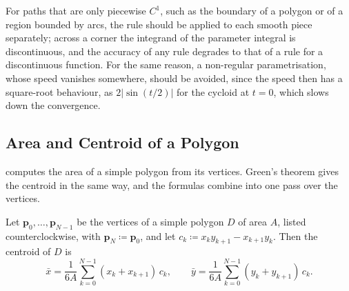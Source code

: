 \begin{table}
\end{table}

For paths that are only piecewise $C^1$, such as the boundary of a polygon or of a region bounded by arcs, the rule should be applied to each smooth piece separately; across a corner the integrand of the parameter integral is discontinuous, and the accuracy of any rule degrades to that of a rule for a discontinuous function. For the same reason, a non-regular parametrisation, whose speed vanishes somewhere, should be avoided, since the speed then has a square-root behaviour, as $2|\sin(t/2)|$ for the cycloid at $t=0$, which slows down the convergence.

\subsection{Area and Centroid of a Polygon}

 computes the area of a simple polygon from its vertices. Green's theorem gives the centroid in the same way, and the formulas combine into one pass over the vertices.

\begin{proposition}
\label{prop:polygon-centroid}
Let $\mathbf p_0,\ldots,\mathbf p_{N-1}$ be the vertices of a simple polygon $D$ of area $A$, listed counterclockwise, with $\mathbf p_N\coloneqq\mathbf p_0$, and let $c_k\coloneqq x_ky_{k+1}-x_{k+1}y_k$. Then the centroid of $D$ is
\[
\bar x=\frac1{6A}\sum_{k=0}^{N-1}(x_k+x_{k+1})\,c_k,\qquad\bar y=\frac1{6A}\sum_{k=0}^{N-1}(y_k+y_{k+1})\,c_k .
\]
\end{proposition}

